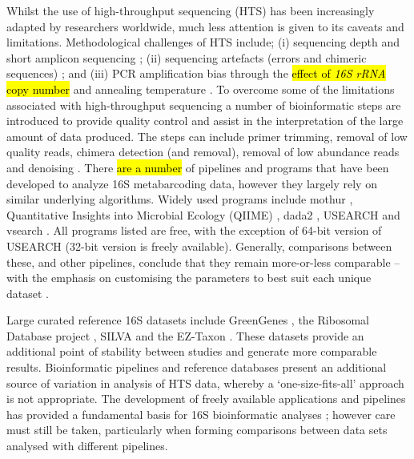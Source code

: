 \documentclass[a4paper, nobind]{templates/ociamthesis}
\begin{document}
Whilst the use of high-throughput sequencing (HTS) has been increasingly adapted by researchers worldwide, much less attention is given to its caveats and limitations. Methodological challenges of HTS include; (i) sequencing depth and short amplicon sequencing \autocite{gihringMassivelyParallelRRNA2012,houImpactNextgenerationSequencing2013,simsSequencingDepthCoverage2014}; (ii) sequencing artefacts (errors and chimeric sequences) \autocite{kuninWrinklesRareBiosphere2010,haasChimeric16SRRNA2011}; and (iii) PCR amplification bias through the \hl{effect of \emph{16S rRNA} copy number} \autocite{ahnEffectsPCRCycle2012} and annealing temperature \autocite{suzukiBiasCausedTemplate1996}.
To overcome some of the limitations associated with high-throughput sequencing a number of bioinformatic steps are introduced to provide quality control and assist in the interpretation of the large amount of data produced.
The steps can include primer trimming, removal of low quality reads, chimera detection (and removal), removal of low abundance reads and denoising \autocite{edgarSearchClusteringOrders2010,kuninWrinklesRareBiosphere2010,haasChimeric16SRRNA2011,edgarUNOISE2ImprovedErrorcorrection2016}.
There \hl{are a number} of pipelines and programs that have been developed to analyze 16S metabarcoding data, however they largely rely on similar underlying algorithms.
Widely used programs include mothur \autocite{schlossIntroducingMothurOpensource2009}, Quantitative Insights into Microbial Ecology (QIIME) \autocite{caporasoQIIMEAllowsAnalysis2010}, dada2 \autocite{callahanDADA2HighresolutionSample2016}, USEARCH \autocite{edgarSearchClusteringOrders2010} and vsearch \autocite{rognesVSEARCHVersatileOpen2016}.
All programs listed are free, with the exception of 64-bit version of USEARCH (32-bit version is freely available).
Generally, comparisons between these, and other pipelines, conclude that they remain more-or-less comparable -- with the emphasis on customising the parameters to best suit each unique dataset \autocite{nilakantaReviewSoftwareAnalyzing2014,plummerComparisonThreeBioinformatics2015,forsterComparisonThreeClustering2016}.

Large curated reference 16S datasets include GreenGenes \autocite{desantisGreengenesChimerachecked16S2006}, the Ribosomal Database project \autocite{coleRibosomalDatabaseProject2009}, SILVA \autocite{pruesseSILVAComprehensiveOnline2007} and the EZ-Taxon \autocite{chunEzTaxonWebbasedTool2007}.
These datasets provide an additional point of stability between studies and generate more comparable results.
Bioinformatic pipelines and reference databases present an additional source of variation in analysis of HTS data, whereby a `one-size-fits-all' approach is not appropriate.
The development of freely available applications and pipelines has provided a fundamental basis for 16S bioinformatic analyses \autocite{schlossIntroducingMothurOpensource2009,caporasoQIIMEAllowsAnalysis2010,edgarSearchClusteringOrders2010}; however care must still be taken, particularly when forming comparisons between data sets analysed with different pipelines.
\end{document}
